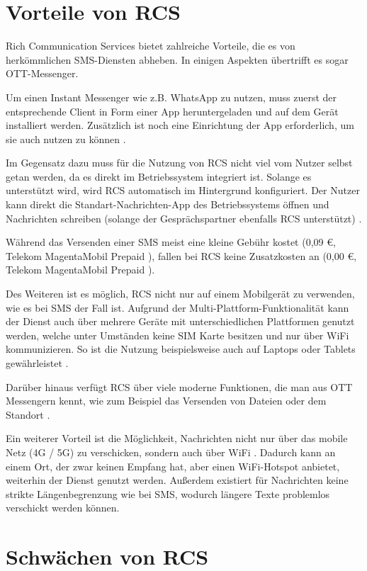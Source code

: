 \documentclass[conference]{IEEEtran}
\begin{document}
\section{Vorteile von RCS}

Rich Communication Services bietet zahlreiche Vorteile, die es von herkömmlichen SMS-Diensten abheben.
In einigen Aspekten übertrifft es sogar OTT-Messenger.

Um einen Instant Messenger wie z.B. WhatsApp zu nutzen, muss zuerst der entsprechende Client in Form einer App heruntergeladen und auf dem Gerät installiert werden.
Zusätzlich ist noch eine Einrichtung der App erforderlich, um sie auch nutzen zu können \cite{5gmsg,rcsmno}.

Im Gegensatz dazu muss für die Nutzung von RCS nicht viel vom Nutzer selbst getan werden, da es direkt im Betriebssystem integriert ist.
Solange es unterstützt wird, wird RCS automatisch im Hintergrund konfiguriert.
Der Nutzer kann direkt die Standart-Nachrichten-App des Betriebssystems öffnen und Nachrichten schreiben (solange der Gesprächspartner ebenfalls RCS unterstützt) \cite{5gmsg,rcsmno}.

Während das Versenden einer SMS meist eine kleine Gebühr kostet (0,09 €, Telekom MagentaMobil Prepaid \cite{telekomsms}), fallen bei RCS keine Zusatzkosten an (0,00 €, Telekom MagentaMobil Prepaid \cite{telekomrcs}).

Des Weiteren ist es möglich, RCS nicht nur auf einem Mobilgerät zu verwenden, wie es bei SMS der Fall ist.
Aufgrund der Multi-Plattform-Funktionalität kann der Dienst auch über mehrere Geräte mit unterschiedlichen Plattformen genutzt werden, welche unter Umständen keine SIM Karte besitzen und nur über WiFi kommunizieren.
So ist die Nutzung beispielsweise auch auf Laptops oder Tablets gewährleistet \cite{rcsmno,uniprof}.

Darüber hinaus verfügt RCS über viele moderne Funktionen, die man aus OTT Messengern kennt, wie zum Beispiel das Versenden von Dateien oder dem Standort \cite{wafaq,uniprof}.

Ein weiterer Vorteil ist die Möglichkeit, Nachrichten nicht nur über das mobile Netz (4G / 5G) zu verschicken, sondern auch über WiFi \cite{5gmsg}.
Dadurch kann an einem Ort, der zwar keinen Empfang hat, aber einen WiFi-Hotspot anbietet, weiterhin der Dienst genutzt werden.
Außerdem existiert für Nachrichten keine strikte Längenbegrenzung wie bei SMS, wodurch längere Texte problemlos verschickt werden können.


\section{Schwächen von RCS}
\end{document}
